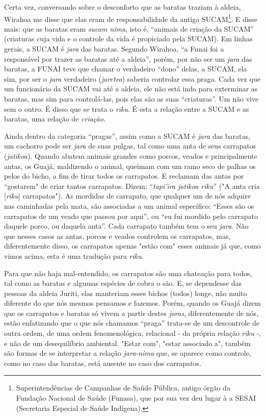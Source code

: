Certa vez, conversando sobre o desconforto que as baratas traziam à
aldeia, Wirahoa me disse que elas eram de responsabilidade da antiga
SUCAM\footnote{Superintendências de Campanhas de Saúde Pública, antigo
  órgão da Fundação Nacional de Saúde (Funasa), que por sua vez deu
  lugar à a SESAI (Secretaria Especial de Saúde Indígena).}. E disse
mais: que as baratas eram \emph{sucam nima}, isto é, ``animais de
criação da SUCAM'' (criaturas cuja vida e o controle da vida é
propiciado pela SUCAM). Em linhas gerais, a SUCAM é \emph{jara} das
baratas. Segundo Wirahoa, ``a Funai foi a responsável por trazer as
baratas até a aldeia'', porém, por não ser um \emph{jara} das baratas, a
FUNAI teve que chamar o verdadeiro ``dono'' delas, a SUCAM, ela sim, por
ser o \emph{jara} verdadeiro (\emph{jaretea}) saberia controlar essa
praga. Cada vez que um funcionário da SUCAM vai até a aldeia, ele não
está indo para exterminar as baratas, mas sim para controlá-las, pois
elas são as suas ``criaturas''. Um não vive sem o outro. É disso que se
trata o \emph{riku}. É esta a relação entre a SUCAM e as baratas, uma
relação de \emph{criação}.

Ainda dentro da categoria ``pragas'', assim como a SUCAM é \emph{jara}
das baratas, um cachorro pode ser \emph{jara} de suas pulgas, tal como
uma anta de seus carrapatos (\emph{jatikoa}). Quando abatem animais
grandes como porcos, veados e principalmente antas, os Guajá, maldizendo
o animal, queimam com um ramo seco de palhas os pelos do bicho, a fim de
tirar todos os carrapatos. E reclamam das antas por ``gostarem" de criar
tantos carrapatos. Dizem: ``\emph{tapi'ira} \emph{jatikoa riku}'' ("A
anta cria {[}\emph{riku}{]} carrapatos"). As mordidas de carrapato, que
qualquer um de nós adquire nas caminhadas pela mata, são associadas a um
animal específico: ``Esses são os carrapatos de um veado que passou por
aqui'', ou ``eu fui mordido pelo carrapato daquele porco, ou daquela
anta''. Cada carrapato também tem o seu \emph{jara}. Não que nesses
casos as antas, porcos e veados controlem os carrapatos, mas,
diferentemente disso, os carrapatos apenas "estão com" esses animais já
que, como vimos acima, esta é uma tradução para \emph{riku}.

Para que não haja mal-entendido, os carrapatos são uma chateação para
todos, tal como as baratas e algumas espécies de cobra o são. E, se
dependesse das pessoas da aldeia Juriti, elas manteriam esses bichos
(todos) longe, não muito diferente do que nós mesmos pensamos e fazemos.
Porém, quando os Guajá dizem que os carrapatos e baratas só vivem a
partir destes \emph{jaras}, diferentemente de nós, estão enfatizando que
o que nós chamamos ``praga'' trata-se de um descontrole de outra ordem,
de uma ordem fenomenológica, relacional - da própria relação \emph{riku}
-, e não de um desequilíbrio ambiental. "Estar com", "estar associado
a", também são formas de se interpretar a relação \emph{jara-nima} que,
se aparece como controle, como no caso das baratas, está ausente no caso
dos carrapatos.


